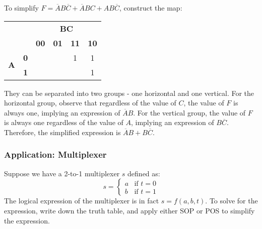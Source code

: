 \begin{example}
    To simplify $F = \overline{A}B\overline{C} + \overline{A}BC + AB\overline{C}$,
    construct the map:

    
    \begin{center}
    \begin{tabular}{rrcccc}
                                            &                                   & \multicolumn{4}{c}{\textbf{BC}}                                                                                       \\
                                            &                                   & \textbf{00}                       & \textbf{01}               & \textbf{11}               & \textbf{10}               \\ \cline{3-6} 
        \multirow{2}{*}{\textbf{A}}         & \multicolumn{1}{r|}{\textbf{0}}   & \multicolumn{1}{c|}{}             & \multicolumn{1}{c|}{}     & \multicolumn{1}{c|}{\color[HTML]{FF0000}1}    & \multicolumn{1}{c|}{\color[HTML]{6200c9}1}    \\ \cline{3-6} 
                                            & \multicolumn{1}{r|}{\textbf{1}}   & \multicolumn{1}{c|}{}             & \multicolumn{1}{c|}{}     & \multicolumn{1}{c|}{}     & \multicolumn{1}{c|}{\color[HTML]{0000FF}1}    \\ \cline{3-6} 
    \end{tabular}
    \end{center}
    
    They can be separated into two groups - one {\color[HTML]{FF0000}horizontal} and one {\color[HTML]{0000FF}vertical}.
    For the horizontal group, observe that regardless of the value of $C$, the value of $F$
    is always one, implying an expression of $\overline{A}B$. For the vertical group,
    the value of $F$ is always one regardless of the value of $A$, implying an expression of
    $B\overline{C}$. Therefore, the simplified expression is $\overline{A}B + B\overline{C}$.
\end{example}

\subsubsection{Application: Multiplexer}

\begin{example}
    Suppose we have a 2-to-1 multiplexer $s$ defined as:
    \begin{equation*}
        s = \begin{cases}
            a & \text{if } t=0 \\
            b & \text{if } t=1
        \end{cases}
    \end{equation*}
    The logical expression of the multiplexer is in fact $s = f(a, b, t)$.
    To solve for the expression, write down the truth table, and apply either SOP or POS
    to simplify the expression.
\end{example}

